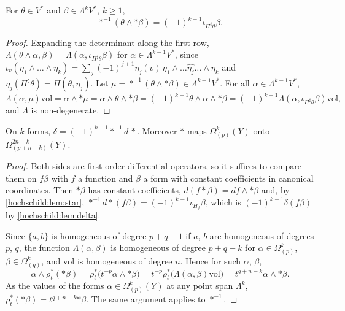\begin{lemma}\label{hochschild:lem:star}
For $\theta\in V^*$ and $\beta\in\Lambda^kV^*$, $k\ge1$,
\begin{equation*}
  *^{-1}(\theta\wedge{*\beta})=(-1)^{k-1}\iota_{\Pi^\sharp\theta}\beta .
\end{equation*}
\end{lemma}
\begin{proof}
Expanding the determinant along the first row,
$\Lambda(\theta\wedge\alpha,\beta)=\Lambda(\alpha,\iota_{\Pi^\sharp\theta}\beta)$
for $\alpha\in\Lambda^{k-1}V^*$, since $\iota_v(\eta_1\wedge\dots\wedge\eta_k)
=\sum_j(-1)^{j+1}\eta_j(v)\,\eta_1\wedge\dots\widehat{\eta_j}\dots\wedge\eta_k$
and $\eta_j(\Pi^\sharp\theta)=\Pi(\theta,\eta_j)$. Let
$\mu=*^{-1}(\theta\wedge*\beta)\in\Lambda^{k-1}V^*$. For all $\alpha\in\Lambda^{k-1}V^*$,
\begin{equation*}
  \Lambda(\alpha,\mu)\mathrm{vol}=\alpha\wedge*\mu=\alpha\wedge\theta\wedge*\beta
  =(-1)^{k-1}\theta\wedge\alpha\wedge*\beta=(-1)^{k-1}\Lambda(\alpha,\iota_{\Pi^\sharp\theta}\beta)\mathrm{vol},
\end{equation*}
and $\Lambda$ is non-degenerate.
\end{proof}

\begin{proposition}[Brylinski]\label{hochschild:prop:star-d}
On $k$-forms, $\delta=(-1)^{k-1}*^{-1}d\,*$. Moreover $*$ maps
$\Omega^k_{(p)}(Y)$ onto $\Omega^{2n-k}_{(p+n-k)}(Y)$.
\end{proposition}
\begin{proof}
Both sides are first-order differential operators, so it suffices to compare
them on $f\beta$ with $f$ a function and $\beta$ a form with constant
coefficients in canonical coordinates. Then $*\beta$ has constant
coefficients, $d(f*\beta)=df\wedge*\beta$ and, by \cref{hochschild:lem:star},
$*^{-1}d*(f\beta)=(-1)^{k-1}\iota_{H_f}\beta$, which is $(-1)^{k-1}\delta(f\beta)$
by \cref{hochschild:lem:delta}.

Since $\{a,b\}$ is homogeneous of degree $p+q-1$ if $a$, $b$ are homogeneous
of degrees $p$, $q$, the function $\Lambda(\alpha,\beta)$ is homogeneous of
degree $p+q-k$ for $\alpha\in\Omega^k_{(p)}$, $\beta\in\Omega^k_{(q)}$, and
$\mathrm{vol}$ is homogeneous of degree $n$. Hence for such $\alpha$,
$\beta$,
\begin{equation*}
  \alpha\wedge\rho_t^*({*\beta})=\rho_t^*\bigl(t^{-p}\alpha\wedge*\beta\bigr)
  =t^{-p}\rho_t^*\bigl(\Lambda(\alpha,\beta)\mathrm{vol}\bigr)=t^{q+n-k}\alpha\wedge*\beta .
\end{equation*}
As the values of the forms $\alpha\in\Omega^k_{(p)}(Y)$ at any point span
$\Lambda^k$, $\rho_t^*({*\beta})=t^{q+n-k}{*\beta}$. The same argument applies
to $*^{-1}$.
\end{proof}

